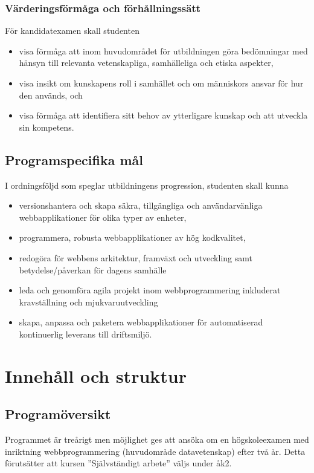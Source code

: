 \documentclass[swedish]{LnuCmThesis}
\begin{document}
\subsubsection*{Värderingsförmåga och förhållningssätt}

För kandidatexamen skall studenten
\begin{itemize}
    \item visa förmåga att inom huvudområdet för utbildningen göra bedömningar med hänsyn till relevanta vetenskapliga, samhälleliga och etiska aspekter,
    \item visa insikt om kunskapens roll i samhället och om människors ansvar för hur den används,
    och
    \item visa förmåga att identifiera sitt behov av ytterligare kunskap och att utveckla sin kompetens.
\end{itemize}

\subsection*{Programspecifika mål}

I ordningsföljd som speglar utbildningens progression, studenten skall kunna

\begin{itemize}
    \item versionshantera och skapa säkra, tillgängliga och användarvänliga webbapplikationer för olika typer av enheter,
    \item programmera, robusta webbapplikationer av hög kodkvalitet,
    \item redogöra för webbens arkitektur, framväxt och utveckling samt betydelse/påverkan för dagens samhälle
    \item leda och genomföra agila projekt inom webbprogrammering inkluderat kravställning och mjukvaruutveckling
    \item skapa, anpassa och paketera webbapplikationer för automatiserad kontinuerlig leverans till driftsmiljö.
\end{itemize}

\section*{Innehåll och struktur}

\subsection*{Programöversikt}
Programmet är treårigt men möjlighet ges att ansöka om en högskoleexamen med inriktning webbprogrammering (huvudområde datavetenskap) efter två år. Detta förutsätter att kursen ''Självständigt arbete'' väljs under åk2.
\end{document}
